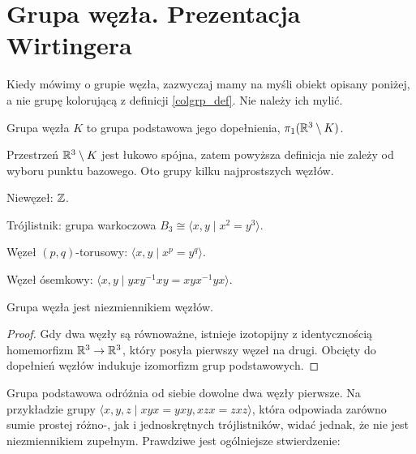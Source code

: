 \section{Grupa węzła. Prezentacja Wirtingera} %
\label{sec:group_wirtinger}
Kiedy mówimy o grupie węzła,
zazwyczaj mamy na myśli obiekt opisany poniżej,
a nie grupę kolorującą z definicji \ref{colgrp_def}.
Nie należy ich mylić.

\begin{definition}
    \label{def:knot_group}
    Grupa węzła $K$ to grupa podstawowa jego dopełnienia, $\pi_1(\mathbb R^3 \setminus K)$.
\end{definition}

Przestrzeń $\mathbb R^3 \setminus K$ jest łukowo spójna,
zatem powyższa definicja nie zależy od wyboru punktu bazowego.
Oto grupy kilku najprostszych węzłów.

\begin{example}
    Niewęzeł: $\mathbb Z$.
\end{example}

\begin{example}
    Trójlistnik: grupa warkoczowa $B_3 \cong \langle x, y \mid x^2 = y^3\rangle$.
\end{example}

\begin{example}
    Węzeł $(p,q)$-torusowy: $\langle x, y \mid x^p = y^q \rangle$.
\end{example}

\begin{example}
    Węzeł ósemkowy: $\langle x, y \mid yxy^{{-1}}xy=xyx^{{-1}}yx \rangle$.
\end{example}

\begin{proposition}
    \label{prop:knot_group_invariant}
    Grupa węzła jest niezmiennikiem węzłów.
\end{proposition}

\begin{proof}
    Gdy dwa węzły są równoważne,
    istnieje izotopijny z identycznością homemorfizm $\mathbb R^3 \to \mathbb R^3$,
    który posyła pierwszy węzeł na drugi.
    Obcięty do dopełnień węzłów indukuje izomorfizm grup podstawowych.
\end{proof}

Grupa podstawowa odróżnia od siebie dowolne dwa węzły pierwsze.
Na przykładzie grupy $\langle x,y,z \mid xyx=yxy,xzx=zxz\rangle$,
która odpowiada zarówno sumie prostej różno-, jak i jednoskrętnych trójlistników,
widać jednak, że nie jest niezmiennikiem zupełnym.
Prawdziwe jest ogólniejsze stwierdzenie:

